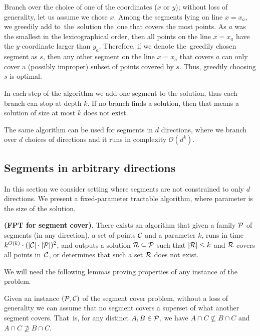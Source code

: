 Branch over the choice of one of the coordinates ($x$ or $y$);
without loss of generality, let us assume we chose $x$.
Among the segments lying on line $x = x_a$,
we greedily add to~the~solution the~one that covers the most points.
As $a$ was the smallest in the lexicographical order,
then all points on the line $x = x_a$ have the $y$-coordinate larger than $y_a$.
Therefore, if we denote the~greedily chosen segment as $s$,
then any other segment on the line $x = x_a$ that covers $a$ can only
cover a (possibly improper) subset of points covered by $s$.
Thus, greedily choosing $s$ is optimal.

In each step of the algorithm we add one segment to the solution,
thus each branch can stop at depth $k$.
If no branch finds a solution, then that means a solution of size at most $k$ does not exist.


\begin{remark}
The same algorithm can be used for segments in $d$ directions,
where we branch over $d$ choices of directions and it runs in complexity $\mathcal{O}(d^k)$.
\end{remark}

\subsection{Segments in arbitrary directions}
\label{segments_in_arbitrary_direction}
In this section we consider setting where segments are not constrained
to only $d$ directions. 
We present a fixed-parameter tractable algorithm,
where parameter is the size of the solution.

\begin{tw}{
	\label{segment_cover_fpt}
	\textbf{(FPT for segment cover)}.
	There exists an algorithm that given a family $\mathcal{P}$ of
	segments (in any direction),
	a set of points $\mathcal{C}$
	and a parameter $k$,
	runs in time $k^{O(k)} \cdot (|\mathcal{C}|\cdot|\mathcal{P}|)^2$,
	and outputs a solution $\mathcal{R} \subseteq \mathcal{P}$
	such that $|\mathcal{R}| \le k$ and $\mathcal{R}$ covers all points in~$\mathcal{C}$,
	or determines that such a set $\mathcal{R}$ does not exist.
}\end{tw}

We will need the following lemmas proving properties of any
instance of the problem.

\begin{lemma}
   \label{fpt_reduction}
   Given an instance $(\mathcal{P}, \mathcal{C})$ of the segment cover problem,
   without a loss of generality we can assume that
   no segment covers a superset of what another segment covers.
   That~is, for any distinct $A, B \in \mathcal{P}$, we have
   $A \cap C \not \subseteq B \cap C$ and $A \cap C \not \supseteq B \cap C$.
\end{lemma}   
   

